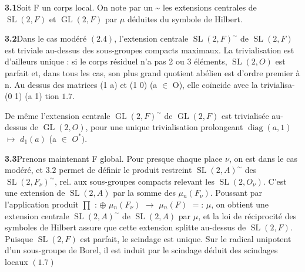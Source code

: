 \documentclass[10pt,a4paper]{article}
\begin{document}
\clearpage
{}
\label{d035-physical-016}
\par\medskip{}\par\smallskip
\par\noindent\textbf{3.1}\quad Soit F un corps local. On note par un \textasciitilde{} les extensions centrales de $\operatorname{SL}(2,F)$ et $\operatorname{GL}(2,F)$ par $\mu{}$ déduites du symbole de Hilbert.\par
\par\noindent\textbf{3.2}\quad Dans le cas modéré $(2.4)$, l'extension centrale $\operatorname{SL}(2,F)^\sim$ de $\operatorname{SL}(2,F)$ est triviale au-dessus des sous-groupes compacts maximaux. La trivialisation est d'ailleurs unique : si le corps résiduel n'a pas 2 ou 3 éléments, $\operatorname{SL}(2,O)$ est parfait et, dans tous les cas, son plus grand quotient abélien est d'ordre premier à n. Au dessus des matrices (1 a) et (1 0) (a $\in{}$ O), elle coïncide avec la trivialisa- (0 1) (a 1) tion $1.7$.\par
\par De même l'extension centrale $\operatorname{GL}(2,F)^\sim$ de $\operatorname{GL}(2,F)$ est trivialisée au-dessus de $\operatorname{GL}(2,O)$, pour une unique trivialisation prolongeant $\operatorname{diag}(a,1)$ $\mapsto{}$ $d_1(a)$ (a $\in{}$ $O^*)$.\par
\par\noindent\textbf{3.3}\quad Prenons maintenant F global. Pour presque chaque place $\nu{}$, on est dans le cas modéré, et $3.2$ permet de définir le produit restreint $\operatorname{SL}(2,A)^\sim$ des $\operatorname{SL}(2,F_\nu{})^\sim$, rel. aux sous-groupes compacts relevant les $\operatorname{SL}(2,O_\nu{})$. C'est une extension de $\operatorname{SL}(2,A)$ par la somme des $\mu{}_n(F_\nu{})$. Poussant par l'application produit $\prod{}$ : $\oplus{}$ $\mu{}_n(F_\nu{})$ $\to{}$ $\mu{}_n(F)$ $=$: $\mu{}$, on obtient une extension centrale $\operatorname{SL}(2,A)^\sim$ de $\operatorname{SL}(2,A)$ par $\mu{}$, et la loi de réciprocité des symboles de Hilbert assure que cette extension splitte au-dessus de $\operatorname{SL}(2,F)$. Puisque $\operatorname{SL}(2,F)$ est parfait, le scindage est unique. Sur le radical unipotent d'un sous-groupe de Borel, il est induit par le scindage déduit des scindages locaux $(1.7)$\par
\end{document}
